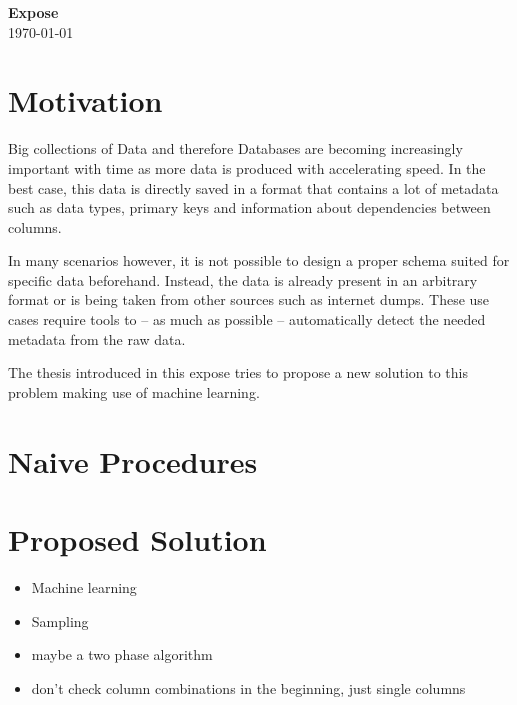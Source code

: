 \documentclass[a4paper]{article}
\begin{document}
\reversemarginpar{}
\thispagestyle{firstpagestyle}
\begin{center}
  \huge \textbf{Expose}\\[8pt]
  \normalsize \today
\end{center}

\section{Motivation}
Big collections of Data and therefore Databases are becoming increasingly important with time as more data is produced with accelerating speed. In the best case, this data is directly saved in a format that contains a lot of metadata such as data types, primary keys and information about dependencies between columns.

In many scenarios however, it is not possible to design a proper schema suited for specific data beforehand. Instead, the data is already present in an arbitrary format or is being taken from other sources such as internet dumps. These use cases require tools to -- as much as possible -- automatically detect the needed metadata from the raw data.

The thesis introduced in this expose tries to propose a new solution to this problem making use of machine learning.


\section{Naive Procedures}\label{sec:naiveProcedures}

\section{Proposed Solution}
\begin{itemize}
  \item Machine learning
  \item Sampling
  \item maybe a two phase algorithm
  \item don't check column combinations in the beginning, just single columns
\end{itemize}
\end{document}
